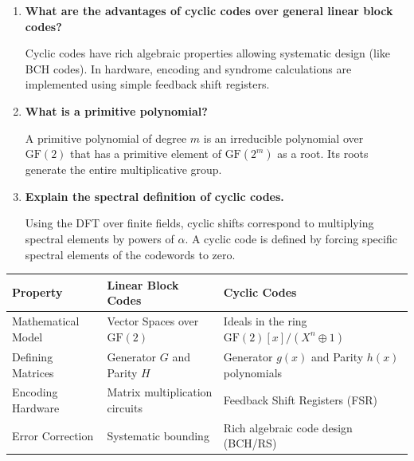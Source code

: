 \documentclass[12pt,a4paper]{article}
\newcommand{\Q}[1]{\textbf{#1}\par\noindent\ignorespaces}
\renewcommand{\arraystretch}{1.45}
\begin{document}
\begin{tcolorbox}[exambox, title={\textbf{Frequently Asked / Viva Questions}}]
\begin{enumerate}[topsep=0pt, label=\textbf{Q\arabic*.}, itemsep=5pt]
  \item \Q{What are the advantages of cyclic codes over general linear block codes?}
    Cyclic codes have rich algebraic properties allowing systematic design (like BCH codes). In hardware, encoding and syndrome calculations are implemented using simple feedback shift registers.
  \item \Q{What is a primitive polynomial?}
    A primitive polynomial of degree $m$ is an irreducible polynomial over $\text{GF}(2)$ that has a primitive element of $\text{GF}(2^m)$ as a root. Its roots generate the entire multiplicative group.
  \item \Q{Explain the spectral definition of cyclic codes.}
    Using the DFT over finite fields, cyclic shifts correspond to multiplying spectral elements by powers of $\alpha$. A cyclic code is defined by forcing specific spectral elements of the codewords to zero.
\end{enumerate}
\end{tcolorbox}

\vspace{6pt}

\begin{tcolorbox}[tikzbox, title={\textbf{Comparison of Linear Block Codes and Cyclic Codes}}]
\renewcommand{\arraystretch}{1.45}
\begin{tabularx}{\linewidth}{|B{3.2cm}|Y|Y|}
\hline
\textbf{Property} & \textbf{Linear Block Codes} & \textbf{Cyclic Codes} \\
\hline
Mathematical Model & Vector Spaces over $\text{GF}(2)$ & Ideals in the ring $\text{GF}(2)[x]/(X^n \oplus 1)$ \\
\hline
Defining Matrices & Generator $G$ and Parity $H$ & Generator $g(x)$ and Parity $h(x)$ polynomials \\
\hline
Encoding Hardware & Matrix multiplication circuits & Feedback Shift Registers (FSR) \\
\hline
Error Correction & Systematic bounding & Rich algebraic code design (BCH/RS) \\
\hline
\end{tabularx}
\end{tcolorbox}
\end{document}

